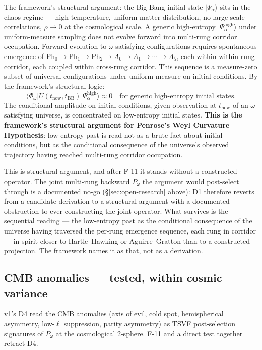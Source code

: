 \documentclass[11pt,a4paper]{article}
\newcommand{\Pomega}{P_{\omega}}
\newcommand{\Phys}{\mathrm{Ph}}
\begin{document}
The framework's structural argument: the Big Bang initial state $|\Psi_\alpha\rangle$ sits in the chaos regime --- high temperature, uniform matter distribution, no large-scale correlations, $\rho \to 0$ at the cosmological scale. A generic high-entropy $|\Psi_\alpha^{\text{high}}\rangle$ under uniform-measure sampling does not evolve forward into multi-rung corridor occupation. Forward evolution to $\omega$-satisfying configurations requires spontaneous emergence of $\Phys_0 \to \Phys_1 \to \Phys_2 \to A_0 \to A_1 \to \cdots \to A_5$, each within within-rung corridor, each coupled within cross-rung corridor. This sequence is a measure-zero subset of universal configurations under uniform measure on initial conditions. By the framework's structural logic:
\[
\langle \Phi_\omega | U(t_{\text{now}}, t_{\text{BB}}) | \Psi_\alpha^{\text{high}} \rangle \approx 0 \quad \text{for generic high-entropy initial states.}
\]
The conditional amplitude on initial conditions, given observation at $t_{\text{now}}$ of an $\omega$-satisfying universe, is concentrated on low-entropy initial states. \textbf{This is the framework's structural argument for Penrose's Weyl Curvature Hypothesis}: low-entropy past is read not as a brute fact about initial conditions, but as the conditional consequence of the universe's observed trajectory having reached multi-rung corridor occupation.

This is structural argument, and after F-11 it stands without a constructed operator. The joint multi-rung backward $\Pomega$ the argument would post-select through is a documented no-go (\S\ref{sec:open-research} above): D1 therefore reverts from a candidate derivation to a structural argument with a documented obstruction to ever constructing the joint operator. What survives is the sequential reading --- the low-entropy past as the conditional consequence of the universe having traversed the per-rung emergence sequence, each rung in corridor --- in spirit closer to Hartle--Hawking or Aguirre--Gratton than to a constructed projection. The framework names it as that, not as a derivation.

\subsection*{CMB anomalies --- tested, within cosmic variance}

v1's D4 read the CMB anomalies (axis of evil, cold spot, hemispherical asymmetry, low-$\ell$ suppression, parity asymmetry) as TSVF post-selection signatures of $\Pomega$ at the cosmological 2-sphere. F-11 and a direct test together retract D4.
\end{document}

